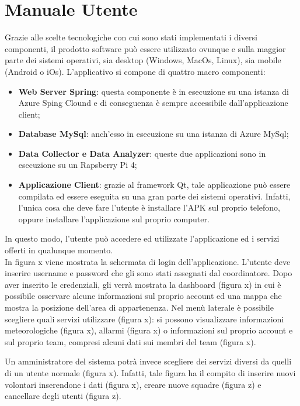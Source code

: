\section{Manuale Utente}
Grazie alle scelte tecnologiche con cui sono stati implementati i diversi componenti, il prodotto software può essere utilizzato ovunque e sulla maggior parte dei sistemi operativi, sia desktop (Windows, MacOs, Linux), sia mobile (Android o iOs).
L'applicativo si compone di quattro macro componenti:
\begin{itemize}
	\item \textbf{Web Server Spring}: questa componente è in esecuzione su una istanza di Azure Sping Clound e di conseguenza è sempre accessibile dall'applicazione client;
	\item \textbf{Database MySql}: anch'esso in esecuzione su una istanza di Azure MySql;
	\item \textbf{Data Collector e Data Analyzer}: queste due applicazioni sono in esecuzione su un Rapsberry Pi 4;
	\item \textbf{Applicazione Client}: grazie al framework Qt, tale applicazione può essere compilata ed essere eseguita su una gran parte dei sistemi operativi. Infatti, l'unica cosa che deve fare l'utente è installare l'APK sul proprio telefono, oppure installare l'applicazione sul proprio computer. 
\end{itemize}

In questo modo, l'utente può accedere ed utilizzate l'applicazione ed i servizi offerti in qualunque momento. 
\\
In figura x viene mostrata la schermata di login dell'applicazione. L'utente deve inserire username e password che gli sono stati assegnati dal coordinatore. 
Dopo aver inserito le credenziali, gli verrà mostrata la dashboard (figura x) in cui è possibile osservare alcune informazioni sul proprio account ed una mappa che mostra la posizione dell'area di appartenenza.
Nel menù laterale è possibile scegliere quali servizi utilizzare (figura x): si possono visualizzare informazioni meteorologiche (figura x), allarmi (figura x) o informazioni sul proprio account e sul proprio team, compresi alcuni dati sui membri del team (figura x).

Un amministratore del sistema potrà invece scegliere dei servizi diversi da quelli di un utente normale (figura x). Infatti, tale figura ha il compito di inserire nuovi volontari inserendone i dati (figura x), creare nuove squadre (figura z) e cancellare degli utenti (figura z).

